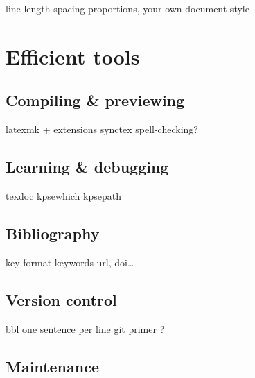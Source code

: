 \documentclass[a4paper,twoside,nofonts]{tufte-handout}
\begin{document}
\cite{bringhurst,designingbooks}

\begin{todoenv}
    line length
    spacing
    proportions, your own document style
\end{todoenv}



\clearpage
\section{Efficient tools} %
\label{sec:tools}

\subsection{Compiling \& previewing} %
\label{sec:compiling}

\begin{todoenv}
    latexmk + extensions
    synctex
    spell-checking?
\end{todoenv}

\subsection{Learning \& debugging} %
\label{sec:learning}

\begin{todoenv}
  texdoc
  kpsewhich
  kpsepath
\end{todoenv}

\subsection{Bibliography} %
\label{sec:bibliography}

\begin{todoenv}
    key format
    keywords
    url, doi…
\end{todoenv}

\subsection{Version control} %
\label{sec:vcs}

\begin{todoenv}
    bbl
    one sentence per line
    git primer ?
\end{todoenv}

\subsection{Maintenance} %
\label{sec:maintenance}
\end{document}
